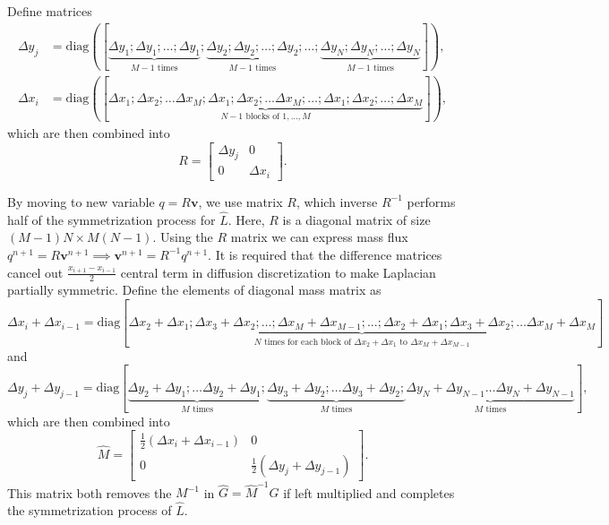 \documentclass{article}
\numberwithin{equation}{section}
\begin{document}
Define matrices 
\begin{equation*}
\begin{aligned}
	\Delta y_j&=\text{diag}([\underbrace{\Delta y_1; \Delta y_1; \dotsc;\Delta y_1}_{M-1\text{ times}}; \underbrace{\Delta y_2; \Delta y_2; \dotsc;\Delta y_2}_{M-1\text{ times}};\dotsc;\underbrace{\Delta y_N; \Delta y_N; \dotsc;\Delta y_N}_{M-1\text{ times}}]),\\
	\Delta x_i&=\text{diag}([\underbrace{\Delta x_1; \Delta x_2;\dotsc\Delta x_M;\Delta x_1; \Delta x_2;\dotsc\Delta x_M; \dotsc;\Delta x_1; \Delta x_2;\dotsc;\Delta x_M}_{N-1\text{ blocks of } 1,\dotsc,M}]),
\end{aligned}
\end{equation*}
which are then combined into
\begin{equation*}
R =\left[\begin{array}{cc}
\Delta y_j & 0 \\
0 & \Delta x_i
\end{array}\right].
\end{equation*}

By moving to new variable ${q} = R\boldsymbol{v}$, we use matrix $R$, which inverse $R^{-1}$ performs half of the symmetrization process for $\hat{L}$. 
Here, $R$ is a diagonal matrix of size $(M-1)N\times M(N-1)$.  Using the $R$ matrix we can express mass flux $q^{n+1}=R\boldsymbol{v}^{n+1}\implies \boldsymbol{v}^{n+1}=R^{-1}q^{n+1}$. It is required that the difference matrices cancel out $\frac{x_{i+1}-x_{i-1}}{2}$ central term in diffusion discretization to make Laplacian partially symmetric. Define the elements of diagonal mass matrix as
\begin{equation*}
{\Delta x_i+\Delta x_{i-1}} = \text{diag}[\underbrace{\Delta x_2+\Delta x_1; \Delta x_3+\Delta x_2; \dotsc ;\Delta x_{M}+\Delta x_{M-1}; ...;\Delta x_2+\Delta x_1; \Delta x_3+\Delta x_2; \dotsc \Delta x_{M}+\Delta x_{M}}_{N\text{ times for each block of } \Delta x_2+\Delta x_1\text{ to }\Delta x_{M}+\Delta x_{M-1}}]
\end{equation*}
and
\begin{equation*}
{\Delta y_j+\Delta y_{j-1}} = \text{diag}[\underbrace{\Delta y_2+\Delta y_1;  \dotsc \Delta y_2+\Delta y_1;}_{M\text{ times}} \underbrace{\Delta y_3+\Delta y_2; \dotsc \Delta y_3+\Delta y_2;}_{M\text{ times}} \underbrace{\Delta y_N+\Delta y_{N-1}\dotsc \Delta y_N+\Delta y_{N-1}}_{M\text{ times}}],	
\end{equation*}
which are then combined into
\begin{equation*}
\hat{M} =\left[\begin{array}{cc}
\frac{1}{2}\left(\Delta x_i+\Delta x_{i-1}\right) & 0 \\
0 & \frac{1}{2}\left(\Delta y_j+\Delta y_{j-1}\right)
\end{array}\right].
\end{equation*}
This matrix both removes the $M^{-1}$ in $\hat{G}=\hat{M}^{-1}G$ if left multiplied and completes the symmetrization process of $\hat{L}$.
\end{document}
